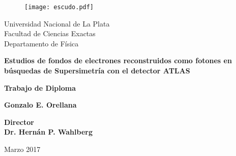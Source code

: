 


\thispagestyle{empty}
\begin{center}

\begin{figure}[h]
\centering
\texttt{[image: escudo.pdf]}
\end{figure}

{\normalsize Universidad Nacional de La Plata\\}
{\normalsize Facultad de Ciencias Exactas\\}
{\normalsize Departamento de Física\\}


\vspace{2cm}

\hrulefill

{\bf \LARGE  Estudios de fondos de electrones reconstruidos como fotones en búsquedas de Supersimetría con el detector ATLAS\\}

\vspace{0.6cm}

\hrulefill

\vspace{0.3cm}

{\normalsize \bf Trabajo de Diploma \\}

\vspace{2.5cm}

{\Large \bf Gonzalo E. Orellana \\}

\vspace{3.5cm}

{\large\bf Director \\}
{\large\bf Dr. Hernán P. Wahlberg \\}

\vspace{2cm}

{\normalsize Marzo 2017}

\end{center}



\restoregeometry



